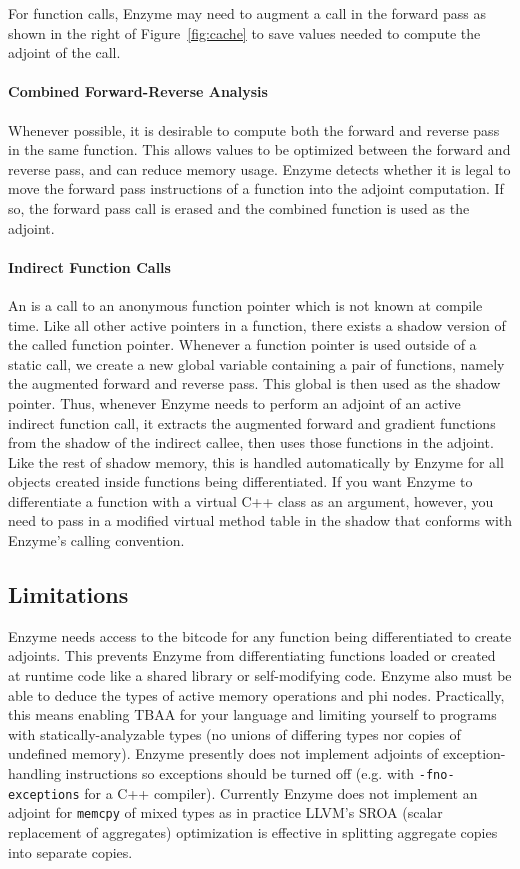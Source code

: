 For function calls, Enzyme may need to augment a call in the forward pass as shown in the right of Figure~\ref{fig:cache} to save values needed to compute the adjoint of the call.

\paragraph{Combined Forward-Reverse Analysis}
Whenever possible, it is desirable to compute both the forward and reverse pass in the same function. This allows values to be optimized between the forward and reverse pass, and can reduce memory usage. Enzyme detects whether it is legal to move the forward pass instructions of a function into the adjoint computation. If so, the forward pass call is erased and the combined function is used as the adjoint.


\paragraph{Indirect Function Calls}
An  is a call to an anonymous function pointer which is not known at compile time. Like all other active pointers in a function, there exists a shadow version of the called function pointer. Whenever a function pointer is used outside of a static call, we create a new global variable containing a pair of functions, namely the augmented forward and reverse pass. This global is then used as the shadow pointer. Thus, whenever Enzyme needs to perform an adjoint of an active indirect function call, it extracts the augmented forward and gradient functions from the shadow of the indirect callee, then uses those functions in the adjoint. Like the rest of shadow memory, this is handled automatically by Enzyme for all objects created inside functions being differentiated. If you want Enzyme to differentiate a function with a virtual C++ class as an argument, however, you need to pass in a modified virtual method table in the shadow that conforms with Enzyme's calling convention.

\subsection{Limitations}
Enzyme needs access to the bitcode for any function being differentiated to create adjoints. This prevents Enzyme from differentiating functions loaded or created at runtime code like a shared library or self-modifying code. Enzyme also must be able to deduce the types of active memory operations and phi nodes. Practically, this means enabling TBAA for your language and limiting yourself to programs with statically-analyzable types (no unions of differing types nor copies of undefined memory). Enzyme presently does not implement adjoints of exception-handling instructions so exceptions should be turned off (e.g. with \texttt{-fno-exceptions} for a C++ compiler).
Currently Enzyme does not implement an adjoint for \texttt{memcpy} of mixed types as in practice LLVM's SROA (scalar replacement of aggregates) optimization is effective in splitting aggregate copies into separate copies\cite{llvm_sroa}.